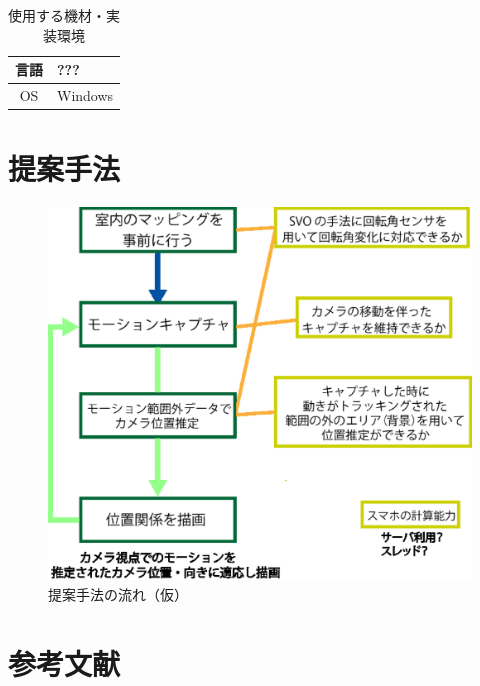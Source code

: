 \documentclass[11pt]{jreport}
\begin{document}
\begin{center}
\begin{table}[H]
\caption{使用する機材・実装環境}
\label{jikkoukannkyou}
\center
\begin{tabular}{|c||l|} \hline
言語 & ??? \\ \hline 
OS & Windows  \\ \hline
\end{tabular}
\end{table}
\end{center}

\chapter{提案手法}\label{chap:fig-tab-exp}

\begin{figure}[htbp]
  \centering
  \includegraphics[scale = 0.5]{memo1.eps}
  \caption{提案手法の流れ（仮）}
  \label{shuhoufig1}
\end{figure}

\chapter{参考文献}



\end{document}
